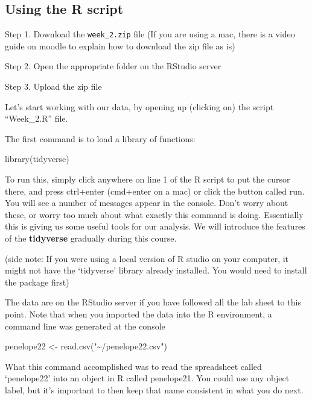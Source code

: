 \documentclass[
]{book}
\newenvironment{Shaded}{\begin{snugshade}}{\end{snugshade}}
\newcommand{\FunctionTok}[1]{\textcolor[rgb]{0.00,0.00,0.00}{#1}}
\newcommand{\NormalTok}[1]{#1}
\newcommand{\OtherTok}[1]{\textcolor[rgb]{0.56,0.35,0.01}{#1}}
\newcommand{\StringTok}[1]{\textcolor[rgb]{0.31,0.60,0.02}{#1}}
\begin{document}
\hypertarget{using-the-r-script}{%
\subsection{Using the R script}\label{using-the-r-script}}

Step 1. Download the \texttt{week\_2.zip} file
(If you are using a mac, there is a video guide on moodle to explain how to download the zip file as is)

Step 2. Open the appropriate folder on the RStudio server

Step 3. Upload the zip file

Let's start working with our data, by opening up (clicking on) the script ``Week\_2.R'' file.

The first command is to load a library of functions:

\begin{Shaded}
\begin{Highlighting}[]
\FunctionTok{library}\NormalTok{(tidyverse)}
\end{Highlighting}
\end{Shaded}

To run this, simply click anywhere on line 1 of the R script to put the cursor there, and press ctrl+enter (cmd+enter on a mac) or click the button called run. You will see a number of messages appear in the console. Don't worry about these, or worry too much about what exactly this command is doing. Essentially this is giving us some useful tools for our analysis. We will introduce the features of the \textbf{tidyverse} gradually during this course.

(side note: If you were using a local version of R studio on your computer, it might not have the `tidyverse' library already installed. You would need to install the package first)

The data are on the RStudio server if you have followed all the lab sheet to this point. Note that when you imported the data into the R environment, a command line was generated at the console

\begin{Shaded}
\begin{Highlighting}[]
\NormalTok{ penelope22 }\OtherTok{\textless{}{-}} \FunctionTok{read.csv}\NormalTok{(}\StringTok{"\textasciitilde{}/penelope22.csv"}\NormalTok{)}
\end{Highlighting}
\end{Shaded}

What this command accomplished was to read the spreadsheet called `penelope22' into an object in R called penelope21. You could use any object label, but it's important to then keep that name consistent in what you do next.
\end{document}
